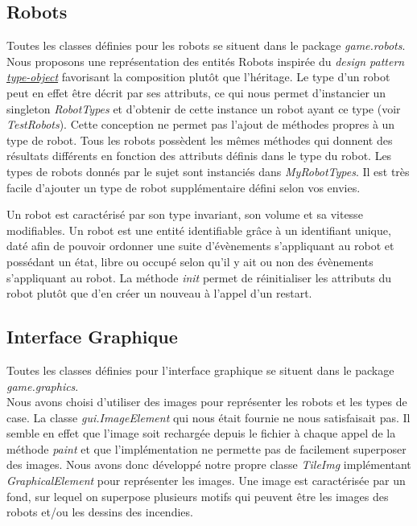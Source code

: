 \documentclass[a4paper, 10pt, french]{article}
\begin{document}
	\subsection{Robots}
	\noindent Toutes les classes définies pour les robots se situent dans le package {\it game.robots}. \\

	Nous proposons une représentation des entités Robots inspirée du {\it design pattern \href{https://gameprogrammingpatterns.com/type-object.html}{type-object}} favorisant la composition plutôt que l'héritage. Le type d'un robot peut en effet être décrit par ses attributs, ce qui nous permet d'instancier un singleton {\it RobotTypes} et d'obtenir de cette instance un robot ayant ce type (voir {\it TestRobots}). Cette conception ne permet pas l'ajout de méthodes propres à un type de robot. Tous les robots possèdent les mêmes méthodes qui donnent des résultats différents en fonction des attributs définis dans le type du robot. Les types de robots donnés par le sujet sont instanciés dans {\it MyRobotTypes}. Il est très facile d'ajouter un type de robot supplémentaire défini selon vos envies.
	\par\leavevmode\par
	Un robot est caractérisé par son type invariant, son volume et sa vitesse modifiables. Un robot est une entité identifiable grâce à un identifiant unique, daté afin de pouvoir ordonner une suite d'évènements s'appliquant au robot et possédant un état, libre ou occupé selon qu'il y ait ou non des évènements s'appliquant au robot. La méthode {\it init} permet de réinitialiser les attributs du robot plutôt que d'en créer un nouveau à l'appel d'un restart.

	\subsection{Interface Graphique}
	\noindent Toutes les classes définies pour l'interface graphique se situent dans le package {\it game.graphics}. \\

	Nous avons choisi d'utiliser des images pour représenter les robots et les types de case. La classe {\it gui.ImageElement} qui nous était fournie ne nous satisfaisait pas. Il semble en effet que l'image soit rechargée depuis le fichier à chaque appel de la méthode {\it paint} et que l'implémentation ne permette pas de facilement superposer des images. Nous avons donc développé notre propre classe {\it TileImg} implémentant {\it GraphicalElement} pour représenter les images. Une image est caractérisée par un fond, sur lequel on superpose plusieurs motifs qui peuvent être les images des robots et/ou les dessins des incendies. \\
	
\end{document}
